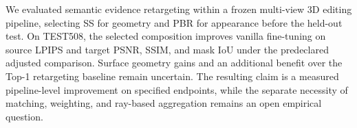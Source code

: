 We evaluated semantic evidence retargeting within a frozen multi-view 3D
editing pipeline, selecting SS for geometry and PBR for appearance before
the held-out test. On TEST508, the selected composition improves vanilla
fine-tuning on source LPIPS and target PSNR, SSIM, and mask IoU under the
predeclared adjusted comparison. Surface geometry gains and an additional
benefit over the Top-1 retargeting baseline remain uncertain. The resulting
claim is a measured pipeline-level improvement on specified endpoints,
while the separate necessity of matching, weighting, and ray-based
aggregation remains an open empirical question.
